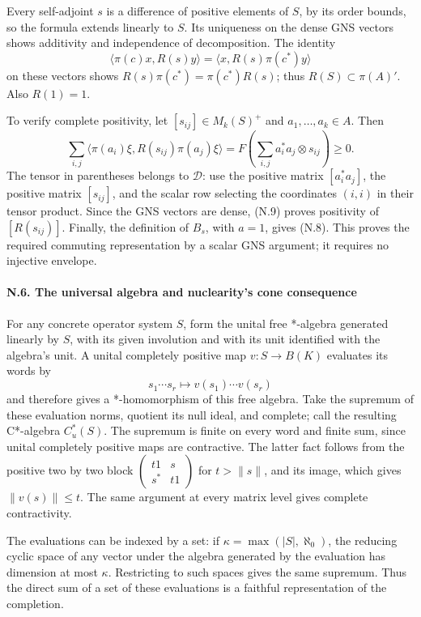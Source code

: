 \documentclass[
  11pt,
]{article}
\begin{document}
Every self-adjoint \(s\) is a difference of positive elements of \(S\),
by its order bounds, so the formula extends linearly to \(S\). Its
uniqueness on the dense GNS vectors shows additivity and independence of
decomposition. The identity \[
\langle\pi(c)x,R(s)y\rangle
=\langle x,R(s)\pi(c^*)y\rangle
\] on these vectors shows \(R(s)\pi(c^*)=\pi(c^*)R(s)\); thus
\(R(S)\subset\pi(A)'\). Also \(R(1)=1\).

To verify complete positivity, let \([s_{ij}]\in M_k(S)^+\) and
\(a_1,\ldots,a_k\in A\). Then \[
\sum_{i,j}\langle\pi(a_i)\xi,R(s_{ij})\pi(a_j)\xi\rangle
=F\!\left(\sum_{i,j}a_i^*a_j\otimes s_{ij}\right)\geq0.
\tag{N.9}
\] The tensor in parentheses belongs to \(\mathcal D\): use the positive
matrix \([a_i^*a_j]\), the positive matrix \([s_{ij}]\), and the scalar
row selecting the coordinates \((i,i)\) in their tensor product. Since
the GNS vectors are dense, (N.9) proves positivity of \([R(s_{ij})]\).
Finally, the definition of \(B_s\), with \(a=1\), gives (N.8). This
proves the required commuting representation by a scalar GNS argument;
it requires no injective envelope.

\paragraph{N.6. The universal algebra and nuclearity's cone
consequence}\label{n.6.-the-universal-algebra-and-nuclearitys-cone-consequence}

For any concrete operator system \(S\), form the unital free *-algebra
generated linearly by \(S\), with its given involution and with its unit
identified with the algebra's unit. A unital completely positive map
\(v:S\to B(K)\) evaluates its words by \[
s_1\cdots s_r\longmapsto v(s_1)\cdots v(s_r)
\] and therefore gives a *-homomorphism of this free algebra. Take the
supremum of these evaluation norms, quotient its null ideal, and
complete; call the resulting C*-algebra \(C_u^*(S)\). The supremum is
finite on every word and finite sum, since unital completely positive
maps are contractive. The latter fact follows from the positive two by
two block \(\begin{pmatrix}t1&s\\s^*&t1\end{pmatrix}\) for \(t>\|s\|\),
and its image, which gives \(\|v(s)\|\leq t\). The same argument at
every matrix level gives complete contractivity.

The evaluations can be indexed by a set: if
\(\kappa=\max(|S|,\aleph_0)\), the reducing cyclic space of any vector
under the algebra generated by the evaluation has dimension at most
\(\kappa\). Restricting to such spaces gives the same supremum. Thus the
direct sum of a set of these evaluations is a faithful representation of
the completion.
\end{document}
